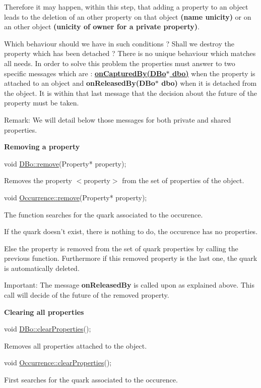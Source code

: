 Therefore it may happen, within this step, that adding a property to an object leads to the deletion of an other property on that object {\bfseries (name unicity)} or on an other object {\bfseries (unicity of owner for a private property)}.

Which behaviour should we have in such conditions ? Shall we destroy the property which has been detached ? There is no unique behaviour which matches all needs. In order to solve this problem the properties must answer to two specific messages which are \-: {\bfseries \hyperlink{classHurricane_1_1Property_ac7b936414d9d85bb6509100b5dd6a667}{on\-Captured\-By(\-D\-Bo$\ast$ dbo)}} when the property is attached to an object and {\bfseries on\-Released\-By(D\-Bo$\ast$ dbo)} when it is detached from the object. It is within that last message that the decision about the future of the property must be taken.

\begin{DoxyParagraph}{Remark\-:}
We will detail below those messages for both private and shared properties.
\end{DoxyParagraph}
{\bfseries Removing a property} 
\begin{DoxyCode}
\textcolor{keywordtype}{void} \hyperlink{classHurricane_1_1DBo_a7833a1f0b8c704930bdc00861e63cf5e}{DBo::remove}(Property* property);
\end{DoxyCode}
 Removes the property {\ttfamily $<$property$>$} from the set of properties of the object. 
\begin{DoxyCode}
\textcolor{keywordtype}{void} \hyperlink{classHurricane_1_1Occurrence_a774404aa5eb01371f64cf5fda3f3ffbf}{Occurrence::remove}(Property* property);
\end{DoxyCode}
 The function searches for the quark associated to the occurence.

If the quark doesn't exist, there is nothing to do, the occurence has no properties.

Else the property is removed from the set of quark properties by calling the previous function. Furthermore if this removed property is the last one, the quark is automatically deleted.

\begin{DoxyParagraph}{Important\-:}
The message {\bfseries on\-Released\-By} is called upon as explained above. This call will decide of the future of the removed property.
\end{DoxyParagraph}
{\bfseries Clearing all properties} 
\begin{DoxyCode}
\textcolor{keywordtype}{void} \hyperlink{classHurricane_1_1DBo_a3e02f3d665cb0b2120df2fdfe9c3df4f}{DBo::clearProperties}();
\end{DoxyCode}
 Removes all properties attached to the object. 
\begin{DoxyCode}
\textcolor{keywordtype}{void} \hyperlink{classHurricane_1_1Occurrence_ae9b269d39f3f68645d6d396d7ab5d8b7}{Occurrence::clearProperties}();
\end{DoxyCode}
 First searches for the quark associated to the occurence.

